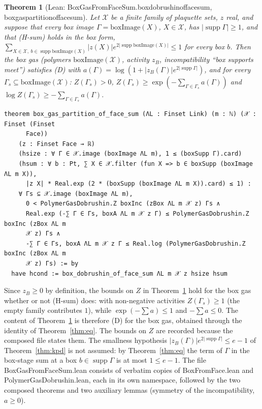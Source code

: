\documentclass[11pt,a4paper]{article}
\newtheorem{theorem}{Theorem}[section]
\theoremstyle{definition}
\theoremstyle{remark}
\DeclareRobustCommand{\lean}[1]{{\ttfamily\renewcommand{\_}{\textunderscore\allowbreak}#1}}
\newenvironment{leanquote}{\par\smallskip\footnotesize}{\par\smallskip}
\newcommand{\supp}{\operatorname{supp}}
\begin{document}
\begin{theorem}[Lean: \lean{BoxGasFromFaceSum.box\_dobrushin\_of\_face\_sum}, \lean{box\_gas\_partition\_of\_face\_sum}]\label{thm:comp}
Let $\mathcal X$ be a finite family of plaquette sets, $z$ real, and suppose that every box image $\Gamma=\mathrm{boxImage}(X)$, $X\in\mathcal X$, has $|\supp\Gamma|\ge1$, and that (H-sum) holds in the box form, $\sum_{X\in\mathcal X,\ b\in\supp\mathrm{boxImage}(X)}|z(X)|e^{2|\supp\mathrm{boxImage}(X)|}\le1$ for every box $b$. Then the box gas (polymers $\mathrm{boxImage}(\mathcal X)$, activity $z_B$, incompatibility ``box supports meet'') satisfies (D) with $a(\Gamma)=\log(1+|z_B(\Gamma)|e^{2|\supp\Gamma|})$, and for every $\Gamma_s\subseteq\mathrm{boxImage}(\mathcal X)$: $Z(\Gamma_s)>0$, $Z(\Gamma_s)\ge\exp(-\sum_{\Gamma\in\Gamma_s}a(\Gamma))$ and $\log Z(\Gamma_s)\ge-\sum_{\Gamma\in\Gamma_s}a(\Gamma)$.
\end{theorem}
\begin{leanquote}
\begin{verbatim}
theorem box_gas_partition_of_face_sum (ΛL : Finset Link) (m : ℕ) (𝒳 : Finset (Finset
      Face))
    (z : Finset Face → ℝ)
    (hsize : ∀ Γ ∈ 𝒳.image (boxImage ΛL m), 1 ≤ (boxSupp Γ).card)
    (hsum : ∀ b : Pt, ∑ X ∈ 𝒳.filter (fun X => b ∈ boxSupp (boxImage ΛL m X)),
      |z X| * Real.exp (2 * (boxSupp (boxImage ΛL m X)).card) ≤ 1) :
    ∀ Γs ⊆ 𝒳.image (boxImage ΛL m),
      0 < PolymerGasDobrushin.Z boxInc (zBox ΛL m 𝒳 z) Γs ∧
      Real.exp (-∑ Γ ∈ Γs, boxA ΛL m 𝒳 z Γ) ≤ PolymerGasDobrushin.Z boxInc (zBox ΛL m
      𝒳 z) Γs ∧
      -∑ Γ ∈ Γs, boxA ΛL m 𝒳 z Γ ≤ Real.log (PolymerGasDobrushin.Z boxInc (zBox ΛL m
      𝒳 z) Γs) := by
  have hcond := box_dobrushin_of_face_sum ΛL m 𝒳 z hsize hsum
\end{verbatim}
\end{leanquote}
Since $z_B\ge0$ by definition, the bounds on $Z$ in Theorem~\ref{thm:comp} hold for the box gas whether or not (H-sum) does: with non-negative activities $Z(\Gamma_s)\ge1$ (the empty family contributes $1$), while $\exp(-\sum a)\le1$ and $-\sum a\le0$. The content of Theorem~\ref{thm:comp} is therefore (D) for the box gas, obtained through the identity of Theorem~\ref{thm:eq}. The bounds on $Z$ are recorded because the composed file states them. The smallness hypothesis $|z_B(\Gamma)|e^{2|\supp\Gamma|}\le e-1$ of Theorem~\ref{thm:kpd} is not assumed: by Theorem~\ref{thm:eq} the term of $\Gamma$ in the box-stage sum at a box $b\in\supp\Gamma$ is at most $1\le e-1$. The file \lean{BoxGasFromFaceSum.lean} consists of verbatim copies of \lean{BoxFromFace.lean} and \lean{PolymerGasDobrushin.lean}, each in its own namespace, followed by the two composed theorems and two auxiliary lemmas (symmetry of the incompatibility, $a\ge0$).
\end{document}

